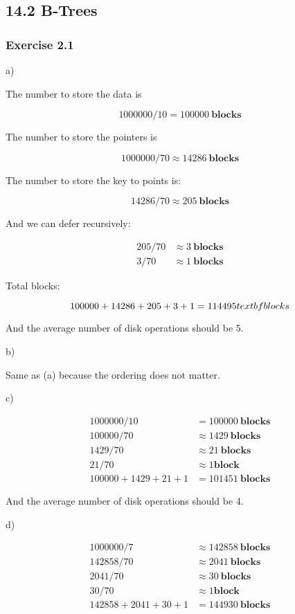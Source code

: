 \documentclass[../../main.tex]{subfiles}
\begin{document}
\subsection{14.2 B-Trees}

\subsubsection*{Exercise 2.1}

a)

The number to store the data is

$$
1000000 / 10 = 100000 \ \textbf{blocks}
$$

The number to store the pointers is

$$
1000000 / 70 \approx 14286 \ \textbf{blocks}
$$

The number to store the key to points is:

$$
14286 / 70 \approx 205 \ \textbf{blocks}
$$

And we can defer recursively:

\begin{align*}
205 / 70 &\approx 3 \ \textbf{blocks} \\
3 / 70 &\approx 1 \ \textbf{blocks}
\end{align*}

Total blocks:

$$
100000 + 14286 + 205 + 3 + 1 = 114495 \\ textbf{blocks}
$$

And the average number of disk operations should be 5.

b)

Same as (a) because the ordering does not matter.

c)

\begin{align*}
  1000000/ 10 &= 100000 \ \textbf{blocks} \\
  100000 / 70 &\approx 1429 \ \textbf{blocks} \\
  1429 / 70 &\approx 21 \ \textbf{blocks} \\
  21 / 70 &\approx 1 \textbf{block} \\
  100000 + 1429 + 21 + 1 &= 101451 \ \textbf{blocks}
\end{align*}

And the average number of disk operations should be 4.

d)

\begin{align*}
  1000000/ 7 &\approx 142858 \ \textbf{blocks} \\
  142858 / 70 &\approx 2041 \ \textbf{blocks} \\
  2041 / 70 &\approx 30 \ \textbf{blocks} \\
  30 / 70 &\approx 1 \textbf{block} \\
  142858 + 2041 + 30 + 1 &= 144930 \ \textbf{blocks}
\end{align*}
\end{document}
